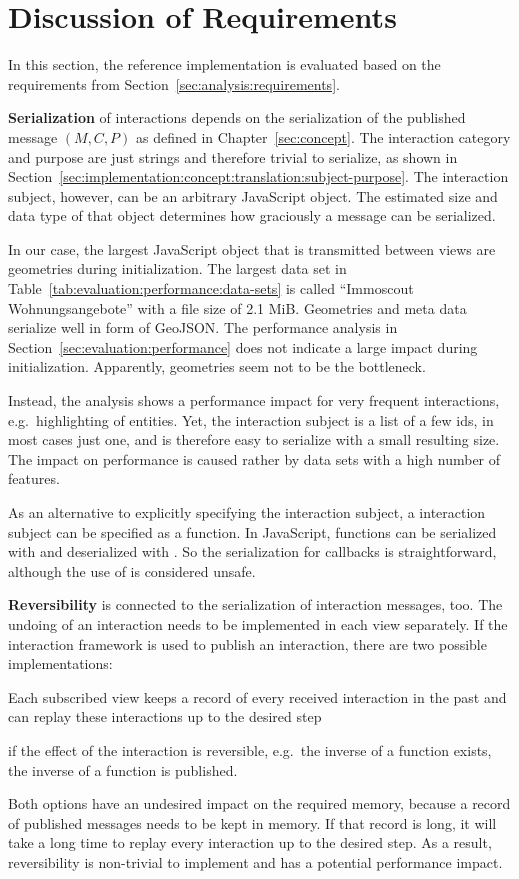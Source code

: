\section{Discussion of Requirements}\label{sec:evaluation:requirements}
In this section, the reference implementation is evaluated based on the requirements from Section~\ref{sec:analysis:requirements}.

\textbf{Serialization} of interactions depends on the serialization of the published message $(M,C,P)$ as defined in Chapter~\ref{sec:concept}.
The interaction category and purpose are just strings and therefore trivial to serialize, as shown in Section~\ref{sec:implementation:concept:translation:subject-purpose}.
The interaction subject, however, can be an arbitrary JavaScript object.
The estimated size and data type of that object determines how graciously a message can be serialized.

In our case, the largest JavaScript object that is transmitted between views are geometries during initialization.
The largest data set in Table~\ref{tab:evaluation:performance:data-sets} is called ``Immoscout Wohnungsangebote'' with a file size of 2.1 MiB.
Geometries and meta data serialize well in form of GeoJSON.
The performance analysis in Section~\ref{sec:evaluation:performance} does not indicate a large impact during initialization.
Apparently, geometries seem not to be the bottleneck.

Instead, the analysis shows a performance impact for very frequent interactions, e.g.\ highlighting of entities.
Yet, the interaction subject is a list of a few ids, in most cases just one, and is therefore easy to serialize with a small resulting size.
The impact on performance is caused rather by data sets with a high number of features.

As an alternative to explicitly specifying the interaction subject, a interaction subject can be specified as a function.
In JavaScript, functions can be serialized with  and deserialized with .
So the serialization for callbacks is straightforward, although the use of  is considered unsafe.

\textbf{Reversibility} is connected to the serialization of interaction messages, too.
The undoing of an interaction needs to be implemented in each view separately.
If the interaction framework is used to publish an  interaction, there are two possible implementations:
\begin{enumerate*}[label=(\arabic*)]
  \item
    Each subscribed view keeps a record of every received interaction in the past and can replay these interactions up to the desired step
    \item
    if the effect of the interaction is reversible, e.g.\ the inverse of a function exists, the inverse of a function is published.
\end{enumerate*}
Both options have an undesired impact on the required memory, because a record of published messages needs to be kept in memory.
If that record is long, it will take a long time to replay every interaction up to the desired step.
As a result, reversibility is non-trivial to implement and has a potential performance impact.


